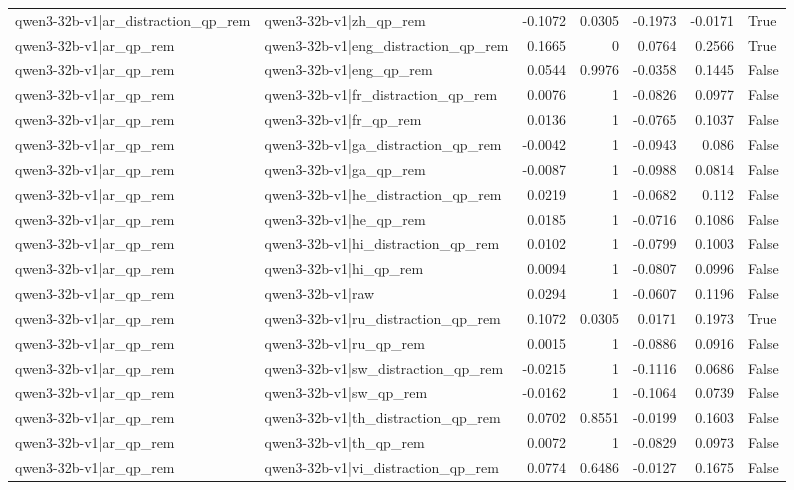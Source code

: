 \begin{table}
\begin{tabular}{l l r r r r l}
qwen3-32b-v1|ar_distraction_qp_rem & qwen3-32b-v1|zh_qp_rem & -0.1072 & 0.0305 & -0.1973 & -0.0171 & True \\
qwen3-32b-v1|ar_qp_rem & qwen3-32b-v1|eng_distraction_qp_rem & 0.1665 & 0 & 0.0764 & 0.2566 & True \\
qwen3-32b-v1|ar_qp_rem & qwen3-32b-v1|eng_qp_rem & 0.0544 & 0.9976 & -0.0358 & 0.1445 & False \\
qwen3-32b-v1|ar_qp_rem & qwen3-32b-v1|fr_distraction_qp_rem & 0.0076 & 1 & -0.0826 & 0.0977 & False \\
qwen3-32b-v1|ar_qp_rem & qwen3-32b-v1|fr_qp_rem & 0.0136 & 1 & -0.0765 & 0.1037 & False \\
qwen3-32b-v1|ar_qp_rem & qwen3-32b-v1|ga_distraction_qp_rem & -0.0042 & 1 & -0.0943 & 0.086 & False \\
qwen3-32b-v1|ar_qp_rem & qwen3-32b-v1|ga_qp_rem & -0.0087 & 1 & -0.0988 & 0.0814 & False \\
qwen3-32b-v1|ar_qp_rem & qwen3-32b-v1|he_distraction_qp_rem & 0.0219 & 1 & -0.0682 & 0.112 & False \\
qwen3-32b-v1|ar_qp_rem & qwen3-32b-v1|he_qp_rem & 0.0185 & 1 & -0.0716 & 0.1086 & False \\
qwen3-32b-v1|ar_qp_rem & qwen3-32b-v1|hi_distraction_qp_rem & 0.0102 & 1 & -0.0799 & 0.1003 & False \\
qwen3-32b-v1|ar_qp_rem & qwen3-32b-v1|hi_qp_rem & 0.0094 & 1 & -0.0807 & 0.0996 & False \\
qwen3-32b-v1|ar_qp_rem & qwen3-32b-v1|raw & 0.0294 & 1 & -0.0607 & 0.1196 & False \\
qwen3-32b-v1|ar_qp_rem & qwen3-32b-v1|ru_distraction_qp_rem & 0.1072 & 0.0305 & 0.0171 & 0.1973 & True \\
qwen3-32b-v1|ar_qp_rem & qwen3-32b-v1|ru_qp_rem & 0.0015 & 1 & -0.0886 & 0.0916 & False \\
qwen3-32b-v1|ar_qp_rem & qwen3-32b-v1|sw_distraction_qp_rem & -0.0215 & 1 & -0.1116 & 0.0686 & False \\
qwen3-32b-v1|ar_qp_rem & qwen3-32b-v1|sw_qp_rem & -0.0162 & 1 & -0.1064 & 0.0739 & False \\
qwen3-32b-v1|ar_qp_rem & qwen3-32b-v1|th_distraction_qp_rem & 0.0702 & 0.8551 & -0.0199 & 0.1603 & False \\
qwen3-32b-v1|ar_qp_rem & qwen3-32b-v1|th_qp_rem & 0.0072 & 1 & -0.0829 & 0.0973 & False \\
qwen3-32b-v1|ar_qp_rem & qwen3-32b-v1|vi_distraction_qp_rem & 0.0774 & 0.6486 & -0.0127 & 0.1675 & False \\

\end{tabular}
\end{table}
